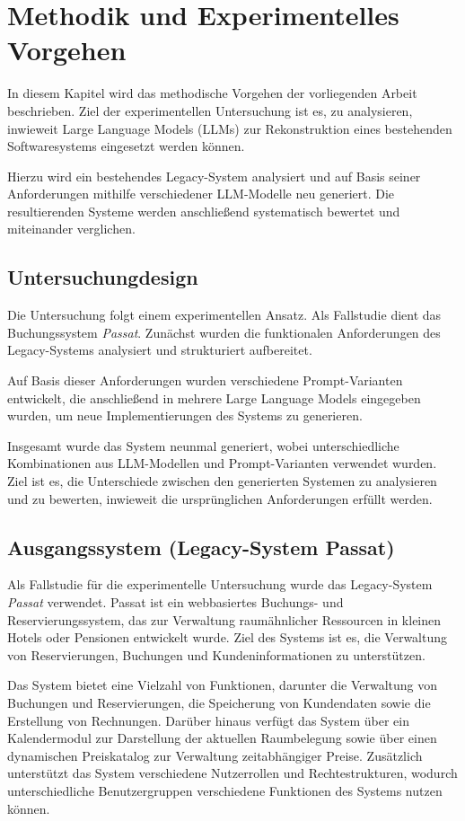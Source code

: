 \chapter{Methodik und Experimentelles Vorgehen}
\label{chapter-konzept}

In diesem Kapitel wird das methodische Vorgehen der vorliegenden
Arbeit beschrieben. Ziel der experimentellen Untersuchung ist es,
zu analysieren, inwieweit Large Language Models (LLMs) zur
Rekonstruktion eines bestehenden Softwaresystems eingesetzt werden
können.

Hierzu wird ein bestehendes Legacy-System analysiert und auf Basis
seiner Anforderungen mithilfe verschiedener LLM-Modelle neu
generiert. Die resultierenden Systeme werden anschließend
systematisch bewertet und miteinander verglichen.

\section{Untersuchungdesign}
Die Untersuchung folgt einem experimentellen Ansatz.
Als Fallstudie dient das Buchungssystem \textit{Passat}.
Zunächst wurden die funktionalen Anforderungen des
Legacy-Systems analysiert und strukturiert aufbereitet.

Auf Basis dieser Anforderungen wurden verschiedene
Prompt-Varianten entwickelt, die anschließend in mehrere
Large Language Models eingegeben wurden, um neue
Implementierungen des Systems zu generieren.

Insgesamt wurde das System neunmal generiert, wobei
unterschiedliche Kombinationen aus LLM-Modellen und
Prompt-Varianten verwendet wurden. Ziel ist es, die
Unterschiede zwischen den generierten Systemen zu
analysieren und zu bewerten, inwieweit die ursprünglichen
Anforderungen erfüllt werden.



\section{Ausgangssystem (Legacy-System Passat)}
Als Fallstudie für die experimentelle Untersuchung wurde das
Legacy-System \textit{Passat} verwendet. Passat ist ein webbasiertes
Buchungs- und Reservierungssystem, das zur Verwaltung
raumähnlicher Ressourcen in kleinen Hotels oder Pensionen
entwickelt wurde. Ziel des Systems ist es, die Verwaltung von
Reservierungen, Buchungen und Kundeninformationen zu
unterstützen.

Das System bietet eine Vielzahl von Funktionen, darunter die
Verwaltung von Buchungen und Reservierungen, die Speicherung
von Kundendaten sowie die Erstellung von Rechnungen. Darüber
hinaus verfügt das System über ein Kalendermodul zur Darstellung
der aktuellen Raumbelegung sowie über einen dynamischen
Preiskatalog zur Verwaltung zeitabhängiger Preise. Zusätzlich
unterstützt das System verschiedene Nutzerrollen und
Rechtestrukturen, wodurch unterschiedliche Benutzergruppen
verschiedene Funktionen des Systems nutzen können.

